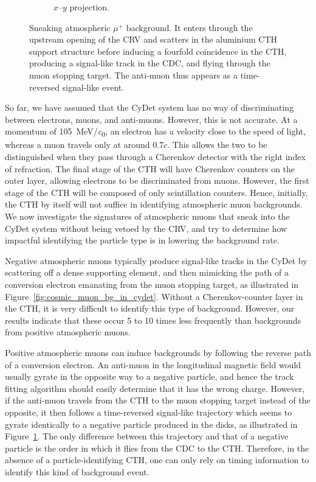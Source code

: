 \begin{figure}
\begin{subfigure}{0.43\textwidth}
        \caption{$x$--$y$ projection.}
    \end{subfigure}
    \caption[Sneaking atmospheric $\mu^+$ background event]{ Sneaking
        atmospheric $\mu^+$ background. It enters through the upstream opening
        of the CRV and scatters in the aluminium CTH support structure before
        inducing a fourfold coincidence in the CTH, producing a signal-like
        track in the CDC, and flying through the muon stopping target. The
        anti-muon thus appears as a time-reversed signal-like event. }
    \label{fig:cosmic_antimuon_bg_in_cydet}
\end{figure}


So far, we have assumed that the CyDet system has no way of discriminating
between electrons, muons, and anti-muons. However, this is not accurate. At
a momentum of \SI{105}{\MeV/\clight}, an electron has a velocity close to the speed of
light, whereas a muon travels only at around $0.7 c$. This allows the two to be
distinguished when they pass through a Cherenkov detector with the right index
of refraction. The final stage of the CTH will have Cherenkov counters on the
outer layer, allowing electrons to be discriminated from muons. However, the
first stage of the CTH will be composed of only scintillation counters. Hence,
initially, the CTH by itself will not suffice in identifying atmospheric muon
backgrounds. We now investigate the signatures of atmospheric muons that sneak
into the CyDet system without being vetoed by the CRV, and try to determine how
impactful identifying the particle type is in lowering the background rate.



Negative atmospheric muons typically produce signal-like tracks in the CyDet by
scattering off a dense supporting element, and then mimicking the path of a
conversion electron emanating from the muon stopping target, as illustrated in
Figure~\ref{fig:cosmic_muon_bg_in_cydet}. Without a Cherenkov-counter layer in
the CTH, it is very difficult to identify this type of background. However, our
results indicate that these occur 5 to 10 times less frequently than backgrounds
from positive atmospheric muons.

Positive atmospheric muons can induce backgrounds by following the reverse path
of a conversion electron. An anti-muon in the longitudinal magnetic field would
usually gyrate in the opposite way to a negative particle, and hence the track
fitting algorithm should easily determine that it has the wrong charge. However,
if the anti-muon travels from the CTH to the muon stopping target instead of the
opposite, it then follows a time-reversed signal-like trajectory which seems to
gyrate identically to a negative particle produced in the disks, as illustrated
in Figure~\ref{fig:cosmic_antimuon_bg_in_cydet}. The only difference between
this trajectory and that of a negative particle is the order in which it flies
from the CDC to the CTH. Therefore, in the absence of a particle-identifying
CTH, one can only rely on timing information to identify this kind of background
event.

